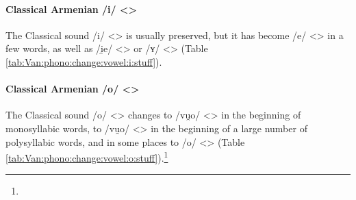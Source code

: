 \paragraph{Classical Armenian /i/ <>} 

The Classical sound /i/ <> is usually preserved, but it has become /e/ <> in a few words, as well as /i̯e/ <> or /ʏ/ <> (Table \ref{tab:Van:phono:change:vowel:i:stuff}).

\begin{table}[H]
	\centering
	\caption{Change from Classical Armenian /i/ <> to /i, e, i̯e, ʏ/ <> in the Van dialect}
	\label{tab:Van:phono:change:vowel:i:stuff}
\end{table} 

\paragraph{Classical Armenian /o/ <>} 

The Classical sound /o/ <> changes to /vu̯o/ <> in the beginning of monosyllabic words, to /vu̯o/ <> in the beginning of a large number of polysyllabic words, and in some places to /o/ <> (Table \ref{tab:Van:phono:change:vowel:o:stuff}).\footnote{}


